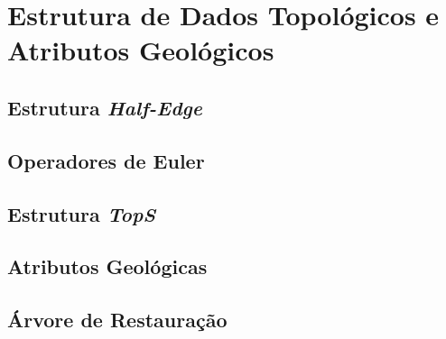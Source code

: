 
\chapter{Estrutura de Dados Topológicos e Atributos Geológicos}

\section{Estrutura \textit{Half-Edge}}

\section{Operadores de Euler}

\section{Estrutura \textit{TopS}}

\section{Atributos Geológicas}

\section{Árvore de Restauração}
